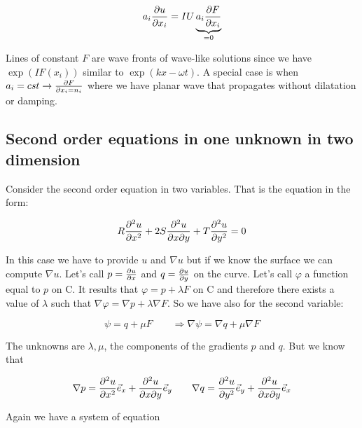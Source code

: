 \begin{equation}
a_i \frac{\partial u }{\partial x_i} = IU \underbrace{a_i \frac{\partial F}{\partial x_i}}_{=0}
\end{equation}

Lines of constant $F$ are wave fronts of wave-like solutions since we have $\exp (I F(x_i))$ similar to $\exp (kx - \omega t)$. A special case is when $a_i = cst \rightarrow \frac{\partial F}{\partial x_i = n_i}$ where we have planar wave that propagates without dilatation or damping.  

\subsection{Second order equations in one unknown in two dimension}
Consider the second order equation in two variables. That is the equation in the form:

\begin{equation}
R\frac{\partial ^2 u}{\partial x^2} + 2S \frac{\partial ^2 u}{\partial x\partial y} + T \frac{\partial ^2 u}{\partial y^2} = 0
\end{equation}

In this case we have to provide $u$ and $\nabla u$ but if we know the surface we can compute $\nabla u$. Let's call $p = \frac{\partial u}{\partial x}$ and $q = \frac{\partial u}{\partial y}$ on the curve. Let's call $\varphi$ a function equal to $p$ on C. It results that $\varphi = p + \lambda F$ on C and therefore there exists a value of $\lambda$ such that $\nabla \varphi = \nabla p + \lambda \nabla F$. So we have also for the second variable: 

\begin{equation}
\psi = q + \mu F \qquad \Rightarrow \nabla \psi = \nabla q + \mu \nabla F
\end{equation}

The unknowns are $\lambda , \mu$, the components of the gradients $p$ and $q$. But we know that 

\begin{equation}
\nabla p = \frac{\partial ^2 u}{\partial x^2} \vec{e}_x + \frac{\partial ^2 u}{\partial x \partial y} \vec{e}_y\qquad \nabla q = \frac{\partial ^2 u}{\partial y^2} \vec{e}_y + \frac{\partial ^2 u}{\partial x \partial y} \vec{e}_x
 \end{equation}
 
Again we have a system of equation

